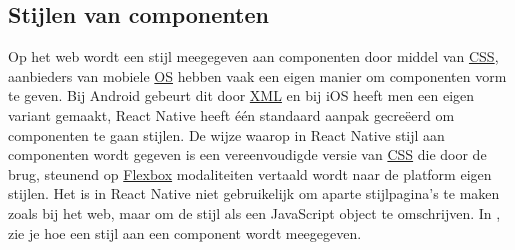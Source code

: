 \subsection{Stijlen van componenten}
Op het web wordt een stijl meegegeven aan componenten door middel van \hyperref[css]{CSS}, aanbieders van mobiele \hyperref[os]{OS} hebben vaak een eigen manier om componenten vorm te geven. Bij Android gebeurt dit door \hyperref[xml]{XML} en bij iOS heeft men een eigen variant gemaakt, React Native heeft één standaard aanpak gecreëerd om componenten te gaan stijlen. De wijze waarop in React Native stijl aan componenten wordt gegeven is een vereenvoudigde versie van \hyperref[css]{CSS} die door de brug, steunend op \hyperref[flexbox]{Flexbox} modaliteiten vertaald wordt naar de platform eigen stijlen.
Het is in React Native niet gebruikelijk om aparte stijlpagina’s te maken zoals bij het web, maar om de stijl als een JavaScript object te omschrijven. In , zie je hoe een stijl aan een component wordt meegegeven.
 
